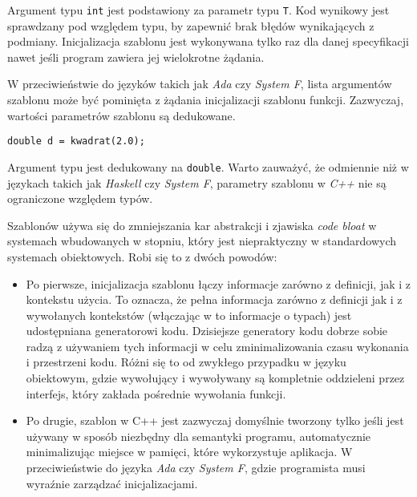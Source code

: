 \documentclass[11pt, a4paper]{article}
\begin{document}
Argument typu \verb#int# jest podstawiony za parametr typu \verb#T#. Kod wynikowy jest sprawdzany pod względem typu, by zapewnić brak błędów wynikających z podmiany. Inicjalizacja szablonu jest wykonywana tylko raz dla danej specyfikacji nawet jeśli program zawiera jej wielokrotne żądania. 

W przeciwieństwie do języków takich jak \emph{Ada} czy \emph{System F}, lista argumentów szablonu może być pominięta z żądania inicjalizacji szablonu funkcji. Zazwyczaj, wartości parametrów szablonu są dedukowane.
\newline

\verb#double d = kwadrat(2.0);# \newline

Argument typu jest dedukowany na \verb#double#. Warto zauważyć, że odmiennie niż w językach takich jak \emph{Haskell} czy \emph{System F}, parametry szablonu w \emph{C++} nie są ograniczone względem typów.

Szablonów używa się do zmniejszania kar abstrakcji i zjawiska \emph{code bloat} w systemach wbudowanych w stopniu, który jest niepraktyczny w standardowych systemach obiektowych. Robi się to z dwóch powodów:

\begin{itemize}

\item Po pierwsze, inicjalizacja szablonu łączy informacje zarówno z definicji, jak i z kontekstu użycia. To oznacza, że pełna informacja zarówno z definicji jak i z wywołanych kontekstów (włączając w to informacje o typach) jest udostępniana generatorowi kodu. Dzisiejsze generatory kodu dobrze sobie radzą z używaniem tych informacji w celu zminimalizowania czasu wykonania i przestrzeni kodu. Różni się to od zwykłego przypadku w języku obiektowym, gdzie wywołujący i wywoływany są kompletnie oddzieleni przez interfejs, który zakłada pośrednie wywołania funkcji.

\item Po drugie, szablon w C++ jest zazwyczaj domyślnie tworzony tylko jeśli jest używany w sposób niezbędny dla semantyki programu, automatycznie minimalizując miejsce w pamięci, które wykorzystuje aplikacja. W przeciwieństwie do języka \emph{Ada} czy \emph{System F}, gdzie programista musi wyraźnie zarządzać inicjalizacjami.

\end{itemize}
\end{document}
